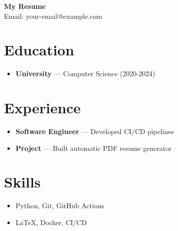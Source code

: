 \documentclass[11pt,a4paper]{article}
\begin{document}
\begin{center}
    \Huge{\textbf{My Resume}}\\
    \vspace{5pt}
    \large{Email: your-email@example.com}
\end{center}

\section*{Education}
\begin{itemize}[leftmargin=*]
    \item \textbf{University} — Computer Science (2020-2024)
\end{itemize}

\section*{Experience}
\begin{itemize}[leftmargin=*]
    \item \textbf{Software Engineer} — Developed CI/CD pipelines
    \item \textbf{Project} — Built automatic PDF resume generator
\end{itemize}

\section*{Skills}
\begin{itemize}[leftmargin=*]
    \item Python, Git, GitHub Actions
    \item LaTeX, Docker, CI/CD 
\end{itemize}
\end{document}
